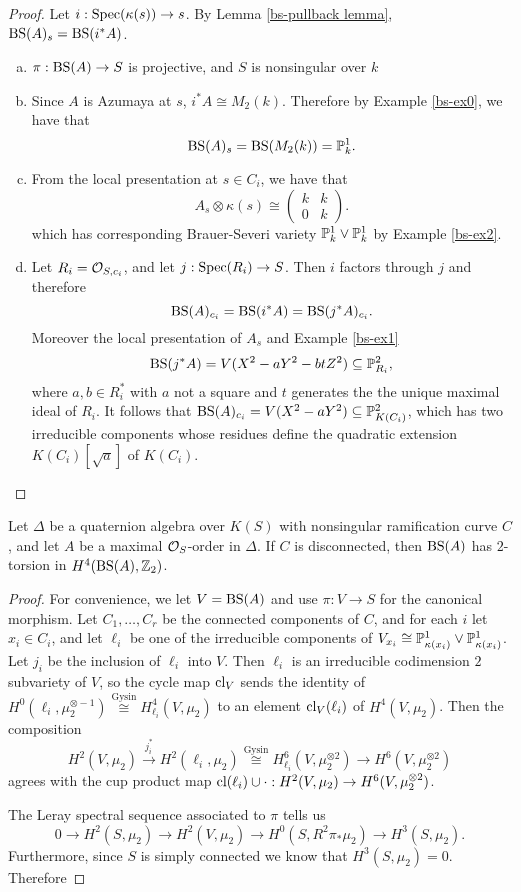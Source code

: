 \begin{proof} Let $i: \textnormal{Spec}(\kappa(s))\rightarrow s$.  By Lemma \ref{bs-pullback lemma}, $\textnormal{BS}(A)_s = \textnormal{BS}(i^*A)$.
\begin{enumerate}[(a)]
\item  $\pi: \textnormal{BS}(A)\rightarrow S$ is projective, and $S$ is nonsingular over $k$
\item  Since $A$ is Azumaya at $s$, $i^*A\cong M_2(k)$.  Therefore by Example \ref{bs-ex0}, we have that
$$\textnormal{BS}(A)_s = \textnormal{BS}(M_2(k)) = \mathbb{P}^1_k.$$
\item
From the local presentation at $s\in C_i$, we have that
$$A_s\otimes\kappa(s) \cong\left(\begin{array}{cc}
k & k\\
0 & k
\end{array}\right).$$
which has corresponding Brauer-Severi variety $\mathbb{P}^1_k\vee\mathbb{P}^1_k$ by Example \ref{bs-ex2}.
\item
Let $R_i = \mathcal{O}_{S,c_i}$, and let $j: \textnormal{Spec}(R_i)\rightarrow S$.  Then $i$ factors through $j$ and therefore
$$\textnormal{BS}(A)_{c_i} = \textnormal{BS}(i^*A) = \textnormal{BS}(j^*A)_{c_i}.$$
Moreover the local presentation of $A_s$ and Example \ref{bs-ex1}
$$\textnormal{BS}(j^*A) = V(X^2 - aY^2 - btZ^2)\subseteq \mathbb{P}^2_{R_i},$$
where $a,b\in R_i^*$ with $a$ not a square and $t$ generates the the unique maximal ideal of $R_i$.  It follows that $\textnormal{BS}(A)_{c_i} = V(X^2-aY^2)\subseteq \mathbb{P}^2_{K(C_i)}$, which has two irreducible components whose residues define the quadratic extension $K(C_i)[\sqrt{a}]$ of $K(C_i)$.
\end{enumerate}
\end{proof}

\begin{prop}
Let $\Delta$ be a quaternion algebra over $K(S)$ with nonsingular ramification curve $C$, and let $A$ be a maximal $\mathcal{O}_S$-order in $\Delta$.  If $C$ is disconnected, then $\textnormal{BS}(A)$ has $2$-torsion in $H^4(\textnormal{BS}(A),\mathbb{Z}_2)$.
\end{prop}
\begin{proof}
For convenience, we let $V = \textnormal{BS}(A)$ and use $\pi: V\rightarrow S$ for the canonical morphism.  Let $C_1,\dots, C_r$ be the connected components of $C$, and for each $i$ let $x_i\in C_i$, and let $\ell_i$ be one of the irreducible components of $V_{x_i}\cong \mathbb{P}^1_{\kappa(x_i)}\vee\mathbb{P}^1_{\kappa(x_i)}$.  Let $j_i$ be the inclusion of $\ell_i$ into $V$.  Then $\ell_i$ is an irreducible codimension $2$ subvariety of $V$, so the cycle map $\textnormal{cl}_V$ sends the identity of $H^0(\ell_i,\mu_2^{\otimes-1})\stackrel{\text{Gysin}}{\cong} H^4_{\ell_i}(V,\mu_2)$ to an element $\textnormal{cl}_{V}(\ell_i)$ of $H^4(V,\mu_2)$.
Then the composition
$$H^2(V,\mu_2)\xrightarrow{j_i^*} H^2(\ell_i,\mu_2)\stackrel{\text{Gysin}}{\cong} H^6_{\ell_i}(V,\mu_2^{\otimes 2})\rightarrow H^6(V,\mu_2^{\otimes 2})$$
agrees with the cup product map $\textnormal{cl}(\ell_i)\cup\cdot: H^2(V,\mu_2)\rightarrow H^6(V,\mu_2^{\otimes 2})$.

The Leray spectral sequence associated to $\pi$ tells us
$$0\rightarrow H^2(S,\mu_2)\rightarrow H^2(V,\mu_2)\rightarrow H^0(S,R^2\pi_*\mu_2)\rightarrow H^3(S,\mu_2).$$
Furthermore, since $S$ is simply connected we know that $H^3(S,\mu_2) = 0$.  Therefore 
\end{proof}



